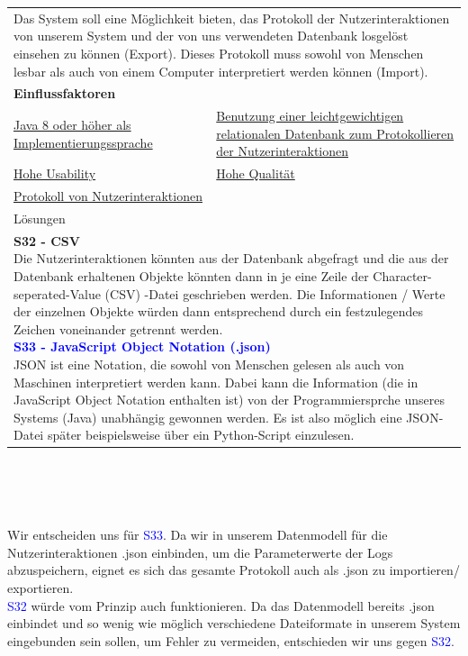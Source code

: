 \documentclass[enabledeprecatedfontcommands,fontsize=11pt,paper=a4,twoside]{scrartcl}
\newcounter{one}
\newcommand{\cb}[1]{{\textcolor{blue}{#1}}}
\begin{document}
\newpage
\hspace{-0.65cm}
\begin{tabular} {|p{8cm} p{8cm}|}
	\hline
	\rowcolor{prob}\multicolumn{2}{|l|}{\parbox{16cm}{\textbf{12: Protokoll der Nutzerinteraktionen exportieren/ importieren}}} \\  \hline\hline 
	\multicolumn{2}{|l|}{\parbox{16cm}{Das System soll eine Möglichkeit bieten, das Protokoll der Nutzerinteraktionen von unserem System und der von uns verwendeten Datenbank losgelöst einsehen zu können (Export). Dieses Protokoll muss sowohl von Menschen lesbar als auch von einem Computer interpretiert werden können (Import).}}\rule{0pt}{6ex}\\ [1ex] \hline
	\multicolumn{2}{|l|}{\textbf{Einflussfaktoren}}\\
	\hyperlink{b}{Java 8 oder höher als Implementierungssprache} &
	\hyperlink {d}{Benutzung einer leichtgewichtigen relationalen Datenbank zum Protokollieren der Nutzerinteraktionen}\\ 
	\hyperlink {g}{Hohe Usability}&
	\hyperlink {h}{Hohe Qualität}\\
	\hyperlink {bb}{Protokoll von Nutzerinteraktionen} &
	\\ \hline
	\multicolumn{2}{|l|}{Lösungen} \\
	\multicolumn{2}{|l|}{\parbox{16cm}{
			\textbf{S32 - CSV} \\
			Die Nutzerinteraktionen könnten aus der Datenbank abgefragt und die aus der Datenbank erhaltenen Objekte könnten dann in je eine Zeile der Character-seperated-Value (CSV) -Datei geschrieben werden. Die Informationen / Werte der einzelnen Objekte würden dann entsprechend durch ein festzulegendes Zeichen voneinander getrennt werden. \\
			\textbf{\cb{\hypertarget{jjj}{S33 - JavaScript Object Notation (.json)}}} \\
			JSON ist eine Notation, die sowohl von Menschen gelesen als auch von Maschinen interpretiert werden kann. Dabei kann die Information (die in JavaScript Object Notation enthalten ist) von der Programmiersprche unseres Systems (Java) unabhängig gewonnen werden. Es ist also möglich eine JSON-Datei später beispielsweise über ein Python-Script einzulesen.
	} }\\ \hline
\end{tabular}\\ \\ \\
\begin{onehalfspace}
	Wir entscheiden uns für \cb{S33}. Da wir in unserem Datenmodell für die Nutzerinteraktionen .json einbinden, um die Parameterwerte der Logs abzuspeichern, eignet es sich das gesamte Protokoll auch als .json zu importieren/ exportieren. \\
	\cb{S32} würde vom Prinzip auch funktionieren. Da das Datenmodell bereits .json einbindet und so wenig wie möglich verschiedene Dateiformate in unserem System eingebunden sein sollen, um Fehler zu vermeiden, entschieden wir uns gegen \cb{S32}.
\end{onehalfspace}
\end{document}
